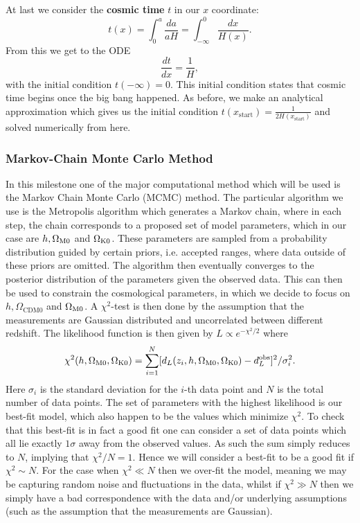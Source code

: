 \documentclass[%
reprint,
 amsmath,amssymb,
 aps,
]{revtex4-2}
\begin{document}
At last we consider the \textbf{cosmic time} $t$ in our $x$ coordinate:
\[t(x)=\int_0^a\frac{da}{aH}=\int_{-\infty}^0\frac{dx}{H(x)}.\]
From this we get to the ODE
\begin{equation}
	\frac{dt}{dx}=\frac{1}{H}, \label{eq:dtdx}
\end{equation}
with the initial condition $t(-\infty)=0$. This initial condition states that cosmic time begins once the big bang happened. As before, we make an analytical approximation which gives us the initial condition $t(x_\text{start})=\frac{1}{2H(x_\text{start})}$ and solved numerically from here.

\subsubsection{Markov-Chain Monte Carlo Method}
In this milestone one of the major computational method which will be used is the Markov Chain Monte Carlo (MCMC) method. The particular algorithm we use is the Metropolis algorithm which generates a Markov chain, where in each step, the chain corresponds to a proposed set of model parameters, which in our case are $h, \Omega_{\text M0}$ and $\Omega_{\text K0}$. These parameters are sampled from a probability distribution guided by certain priors, i.e. accepted ranges, where data outside of these priors are omitted. The algorithm then eventually converges to the posterior distribution of the parameters given the observed data. This can then be used to constrain the cosmological parameters, in which we decide to focus on $h, \Omega_{\text{CDM}0}$ and $\Omega_{\text M0}$. A $\chi^2$-test is then done by the assumption that the measurements are Gaussian distributed and uncorrelated between different redshift. The likelihood function is then given by $L\propto e^{-\chi^2/2}$ where
\[\chi^2(h,\Omega_{\text M0},\Omega_{\text K0})=\sum_{i=1}^N[d_L(z_i,h,\Omega_{\text M0},\Omega_{\text K0})-d_L^\text{obs}]^2/\sigma_i^2.\]
Here $\sigma_i$ is the standard deviation for the $i$-th data point and $N$ is the total number of data points. The set of parameters with the highest likelihood is our best-fit model, which also happen to be the values which minimize $\chi^2$. To check that this best-fit is in fact a good fit one can consider a set of data points which all lie exactly $1\sigma$ away from the observed values. As such the sum simply reduces to $N$, implying that $\chi^2/N=1$. Hence we will consider a best-fit to be a good fit if $\chi^2\sim N$. For the case when $\chi^2\ll N$ then we over-fit the model, meaning we may be capturing random noise and fluctuations in the data, whilst if $\chi^2\gg N$ then we simply have a bad correspondence with the data and/or underlying assumptions (such as the assumption that the measurements are Gaussian).
\end{document}
